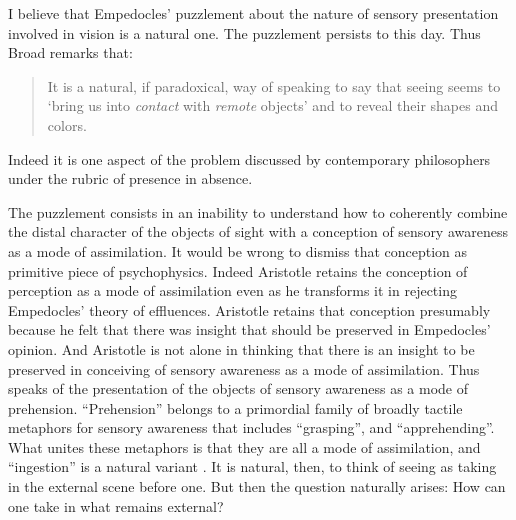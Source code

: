 \documentclass[12pt]{article}
\begin{document}
I believe that Empedocles' puzzlement about the nature of sensory presentation involved in vision is a natural one. The puzzlement persists to this day. Thus Broad remarks that:
\begin{quote}
    It is a natural, if paradoxical, way of speaking to say that seeing seems to `bring us into \emph{contact} with \emph{remote} objects' and to reveal their shapes and colors. \citep[33]{Broad:1952kx}
\end{quote}
Indeed it is one aspect of the problem discussed by contemporary philosophers under the rubric of presence in absence.

The puzzlement consists in an inability to understand how to coherently combine the distal character of the objects of sight with a conception of sensory awareness as a mode of assimilation. It would be wrong to dismiss that conception as primitive piece of psychophysics. Indeed Aristotle retains the conception of perception as a mode of assimilation even as he transforms it in rejecting Empedocles' theory of effluences. Aristotle retains that conception presumably because he felt that there was insight that should be preserved in Empedocles' opinion. And Aristotle is not alone in thinking that there is an insight to be preserved in conceiving of sensory awareness as a mode of assimilation. Thus \citet{Broad:1952kx} speaks of the presentation of the objects of sensory awareness as a mode of prehension.  ``Prehension'' belongs to a primordial family of broadly tactile metaphors for sensory awareness that includes ``grasping'', and ``apprehending''. What unites these metaphors is that they are all a mode of assimilation, and ``ingestion'' is a natural variant \citep[see][7]{Johnston:2006uq,Price:1932fk}. It is natural, then, to think of seeing as taking in the external scene before one.  But then the question naturally arises: How can one take in what remains external?
\end{document}
